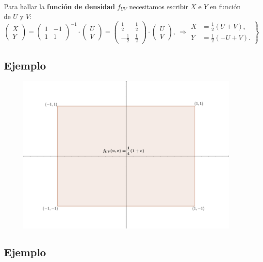 \documentclass[]{book}
\begin{document}
Para hallar la \textbf{función de densidad} \(f_{UV}\) necesitamos escribir \(X\) e \(Y\) en función de \(U\) y \(V\):
\[
\begin{pmatrix}X\\ Y\end{pmatrix}=\begin{pmatrix}1 & -1\\ 1& 1\end{pmatrix}^{-1}\cdot\begin{pmatrix}U\\ V\end{pmatrix}=\begin{pmatrix}\frac{1}{2} & \frac{1}{2}\\ -\frac{1}{2}& \frac{1}{2}\end{pmatrix}\cdot\begin{pmatrix}U\\ V\end{pmatrix},\ \Rightarrow \left.\begin{array}{rl}X & = \frac{1}{2}(U+V),\\ Y & =\frac{1}{2}(-U+V).\end{array}\right\}
\]

\hypertarget{ejemplo-76}{%
\subsection{Ejemplo}\label{ejemplo-76}}

\begin{figure}
\includegraphics[width=750px]{Images/EjTranLineal2} \end{figure}

\hypertarget{ejemplo-77}{%
\subsection{Ejemplo}\label{ejemplo-77}}
\end{document}
